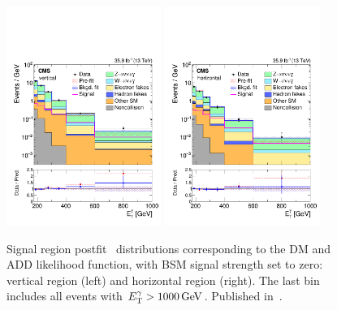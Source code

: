 \begin{figure}[htbp]
  \begin{center}
    \includegraphics[width=0.45\textwidth]{figures/exo16053/Figure_006-b.pdf}
    \includegraphics[width=0.45\textwidth]{figures/exo16053/Figure_006-a.pdf}
    \caption{
      Signal region postfit \ETgamma\ distributions corresponding to the DM and ADD likelihood function, with
      BSM signal strength set to zero: vertical region (left) and horizontal region (right). The last bin includes all events with $\ETgamma > 1000\unit{GeV}$.
      Published in~\cite{ref:JHEP02(2019)074}.
    }
    \label{fig:postfitDM_SR}
  \end{center}
\end{figure}


